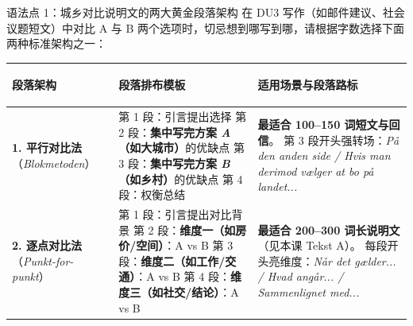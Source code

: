 \begin{grammatikbox}{语法点 1：城乡对比说明文的两大黄金段落架构}
在 DU3 写作（如邮件建议、社会议题短文）中对比 A 与 B 两个选项时，切忌想到哪写到哪，请根据字数选择下面两种标准架构之一：

\vspace{0.3em}
\renewcommand{\arraystretch}{1.24}
{\small
\begin{tabularx}{\linewidth}{@{} >{\bfseries\raggedright\arraybackslash}p{3.0cm} >{\raggedright\arraybackslash}p{5.5cm} >{\raggedright\arraybackslash}X @{}}
\toprule
\textbf{段落架构} & \textbf{段落排布模板} & \textbf{适用场景与段落路标} \\
\midrule
\textbf{1. 平行对比法}\newline （\textit{Blokmetoden}） &
第 1 段：引言提出选择\newline
第 2 段：\textbf{集中写完方案 \textit{A}（如大城市）}的优缺点\newline
第 3 段：\textbf{集中写完方案 \textit{B}（如乡村）}的优缺点\newline
第 4 段：权衡总结 &
\textbf{最适合 100--150 词短文与回信}。\newline
第 3 段开头强转场：\textit{På den anden side / Hvis man derimod vælger at bo på landet...} \\
\midrule
\textbf{2. 逐点对比法}\newline （\textit{Punkt-for-punkt}） &
第 1 段：引言提出对比背景\newline
第 2 段：\textbf{维度一（如房价/空间）}：A vs B\newline
第 3 段：\textbf{维度二（如工作/交通）}：A vs B\newline
第 4 段：\textbf{维度三（如社交/结论）}：A vs B &
\textbf{最适合 200--300 词长说明文}（见本课 Tekst A）。\newline
每段开头亮维度：\textit{Når det gælder... / Hvad angår... / Sammenlignet med...} \\
\bottomrule
\end{tabularx}
}
\end{grammatikbox}

